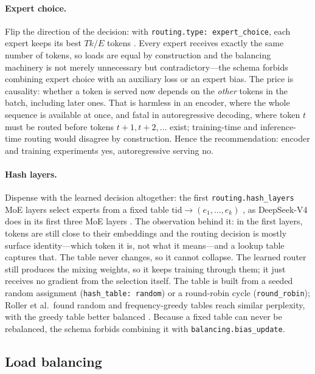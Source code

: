 \paragraph{Expert choice.}
Flip the direction of the decision: with
\texttt{routing.type: expert\_choice}, each expert keeps its best $Tk/E$
tokens \citep{zhou2022expertchoice}. Every expert receives exactly the same
number of tokens, so loads are equal by construction and the balancing
machinery is not merely unnecessary but contradictory---the schema forbids
combining expert choice with an auxiliary loss or an expert bias. The price
is causality: whether a token is served now depends on the \emph{other}
tokens in the batch, including later ones. That is harmless in an encoder,
where the whole sequence is available at once, and fatal in autoregressive
decoding, where token $t$ must be routed before tokens $t{+}1, t{+}2,
\dots$ exist; training-time and inference-time routing would disagree by
construction. Hence the recommendation: encoder and training experiments
yes, autoregressive serving no.

\paragraph{Hash layers.}
Dispense with the learned decision altogether: the first
\texttt{routing.hash\_layers} MoE layers select experts from a fixed table
$\mathrm{tid} \rightarrow (e_1,\dots,e_k)$ \citep{roller2021hash}, as
DeepSeek-V4 does in its first three MoE layers \citep{deepseek2026v4}. The
observation behind it: in the first layers, tokens are still close to their
embeddings and the routing decision is mostly surface identity---which token
it is, not what it means---and a lookup table captures that. The table never
changes, so it cannot collapse. The learned router still produces the mixing
weights, so it keeps training through them; it just receives no gradient from
the selection itself. The table is built from a seeded random assignment
(\texttt{hash\_table: random}) or a round-robin cycle (\texttt{round\_robin});
Roller et al.\ found random and frequency-greedy tables reach similar
perplexity, with the greedy table better balanced \citep{roller2021hash}.
Because a fixed table can never be rebalanced, the schema forbids combining
it with \texttt{balancing.bias\_update}.

\subsection{Load balancing}
\label{app:moe-balancing}

